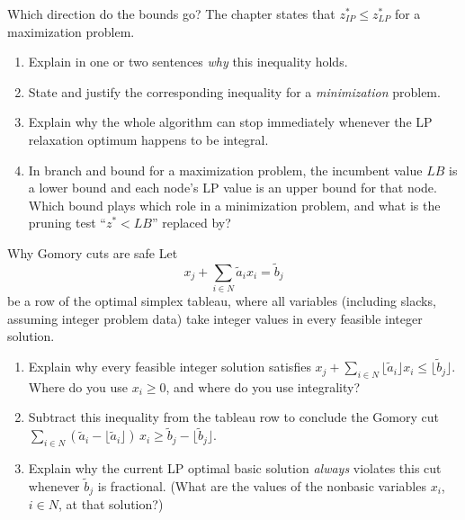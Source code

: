 
\begin{ex}{Which direction do the bounds go?}{}
\label{ex:ch13-bounds-direction}
The chapter states that $z^*_{IP} \leq z^*_{LP}$ for a maximization problem.
\begin{enumerate}
\item Explain in one or two sentences \emph{why} this inequality holds.
\item State and justify the corresponding inequality for a
\emph{minimization} problem.
\item Explain why the whole algorithm can stop immediately whenever the LP
relaxation optimum happens to be integral.
\item In branch and bound for a maximization problem, the incumbent value
$LB$ is a lower bound and each node's LP value is an upper bound for that
node.  Which bound plays which role in a minimization problem, and what is
the pruning test ``$z^* < LB$'' replaced by?
\end{enumerate}
\exrefs{\S\ref{sec:lp-relaxation-ip}; \S\ref{sec:branch-and-bound}}
\end{ex}

\begin{ex}{Why Gomory cuts are safe}{}
\label{ex:ch13-gomory-safe}
Let
\[
x_j + \sum_{i \in N} \tilde a_i x_i = \tilde b_j
\]
be a row of the optimal simplex tableau, where all variables (including
slacks, assuming integer problem data) take integer values in every feasible
integer solution.
\begin{enumerate}
\item Explain why every feasible integer solution satisfies
$x_j + \sum_{i \in N} \lfloor \tilde a_i \rfloor x_i \leq
\lfloor \tilde b_j \rfloor$.  Where do you use $x_i \geq 0$, and where do you
use integrality?
\item Subtract this inequality from the tableau row to conclude the Gomory
cut $\sum_{i \in N} (\tilde a_i - \lfloor \tilde a_i \rfloor)\, x_i \geq
\tilde b_j - \lfloor \tilde b_j \rfloor$.
\item Explain why the current LP optimal basic solution \emph{always}
violates this cut whenever $\tilde b_j$ is fractional.  (What are the values
of the nonbasic variables $x_i$, $i \in N$, at that solution?)
\end{enumerate}
\exrefs{\S\ref{subsec:gomory-cuts}; \S\ref{subsec:chvatal-cuts}}
\end{ex}

